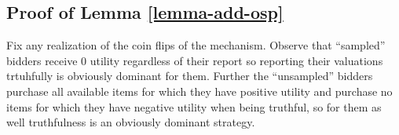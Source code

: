 \subsection{Proof of Lemma \ref{lemma-add-osp}
} \label{subsec::proof-add-osp}
Fix any realization of the coin flips of the mechanism.  Observe that ``sampled'' bidders receive $0$ utility regardless of their report so
reporting their valuations trtuhfully is obviously dominant for them. 
Further the ``unsampled'' bidders purchase all available items for which they have  positive utility and purchase no items for which they have negative utility when being truthful, so for them as well truthfulness is an obviously dominant strategy. 





